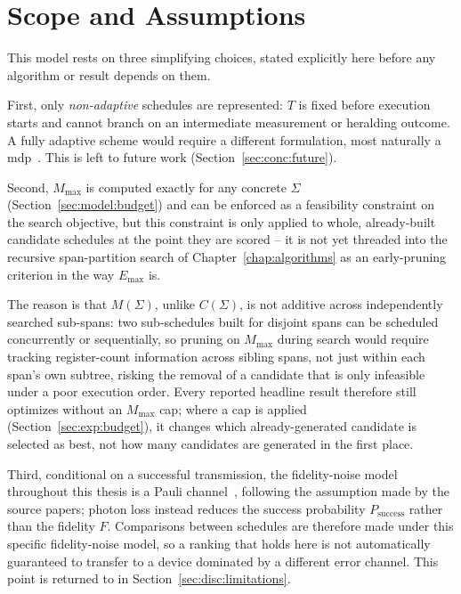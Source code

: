 \section{Scope and Assumptions}
\label{sec:model:scope}



This model rests on three simplifying choices, stated explicitly here before any algorithm or result depends on them.

First, only \emph{non-adaptive} schedules are represented: $T$ is fixed before execution starts and cannot branch on an intermediate measurement or heralding outcome. A fully adaptive scheme would require a different formulation, most naturally a \Gls{mdp}~\cite{Puterman2009Markov,Sutton2014Reinforcement}. This is left to future work (Section~\ref{sec:conc:future}).

Second, $M_{\max}$ is computed exactly for any concrete $\Sigma$ (Section~\ref{sec:model:budget}) and can be enforced as a feasibility constraint on the search objective, but this constraint is only applied to whole, already-built candidate schedules at the point they are scored -- it is not yet threaded into the recursive span-partition search of Chapter~\ref{chap:algorithms} as an early-pruning criterion in the way $E_{\max}$ is.

The reason is that $M(\Sigma)$, unlike $C(\Sigma)$, is not additive across independently searched sub-spans: two sub-schedules built for disjoint spans can be scheduled concurrently or sequentially, so pruning on $M_{\max}$ during search would require tracking register-count information across sibling spans, not just within each span's own subtree, risking the removal of a candidate that is only infeasible under a poor execution order. Every reported headline result therefore still optimizes without an $M_{\max}$ cap; where a cap is applied (Section~\ref{sec:exp:budget}), it changes which already-generated candidate is selected as best, not how many candidates are generated in the first place.

Third, conditional on a successful transmission, the fidelity-noise model throughout this thesis is a Pauli channel~\cite{Nielsen2010Quantum,Jamiolkowski1972Linear,Choi1975Completely}, following the assumption made by the source papers; photon loss instead reduces the success probability $P_{\mathrm{success}}$ rather than the fidelity $F$. Comparisons between schedules are therefore made under this specific fidelity-noise model, so a ranking that holds here is not automatically guaranteed to transfer to a device dominated by a different error channel. This point is returned to in Section~\ref{sec:disc:limitations}.